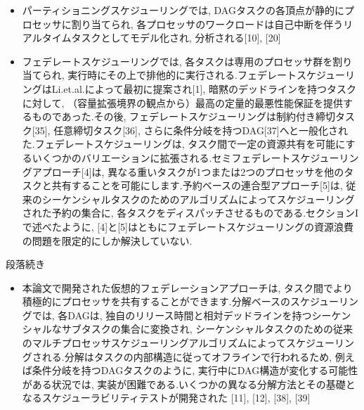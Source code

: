 \begin{frame}{}
    \begin{itemize}
        \item パーティショニングスケジューリングでは, DAGタスクの各頂点が静的にプロセッサに割り当てられ, 各プロセッサのワークロードは自己中断を伴うリアルタイムタスクとしてモデル化され, 分析される[10], [20]
\item フェデレートスケジューリングでは, 各タスクは専用のプロセッサ群を割り当てられ, 実行時にその上で排他的に実行される.フェデレートスケジューリングはLi.et.al.によって最初に提案され[1], 暗黙のデッドラインを持つタスクに対して, （容量拡張境界の観点から）最高の定量的最悪性能保証を提供するものであった.その後, フェデレートスケジューリングは制約付き締切タスク[35], 任意締切タスク[36], さらに条件分岐を持つDAG[37]へと一般化された.フェデレートスケジューリングは, タスク間で一定の資源共有を可能にするいくつかのバリエーションに拡張される.セミフェデレートスケジューリングアプローチ[4]は, 異なる重いタスクが1つまたは2つのプロセッサを他のタスクと共有することを可能にします.予約ベースの連合型アプローチ[5]は, 従来のシーケンシャルタスクのためのアルゴリズムによってスケジューリングされた予約の集合に, 各タスクをディスパッチさせるものである.セクションIで述べたように, [4]と[5]はともにフェデレートスケジューリングの資源浪費の問題を限定的にしか解決していない.
    \end{itemize}
\end{frame}

\begin{frame}{段落続き}
    \begin{itemize}
        \item 本論文で開発された仮想的フェデレーションアプローチは, タスク間でより積極的にプロセッサを共有することができます.分解ベースのスケジューリングでは, 各DAGは, 独自のリリース時間と相対デッドラインを持つシーケンシャルなサブタスクの集合に変換され, シーケンシャルタスクのための従来のマルチプロセッサスケジューリングアルゴリズムによってスケジューリングされる.分解はタスクの内部構造に従ってオフラインで行われるため, 例えば条件分岐を持つDAGタスクのように, 実行中にDAG構造が変化する可能性がある状況では, 実装が困難である.いくつかの異なる分解方法とその基礎となるスケジューラビリティテストが開発された [11], [12], [38], [39]
    \end{itemize}
\end{frame}
